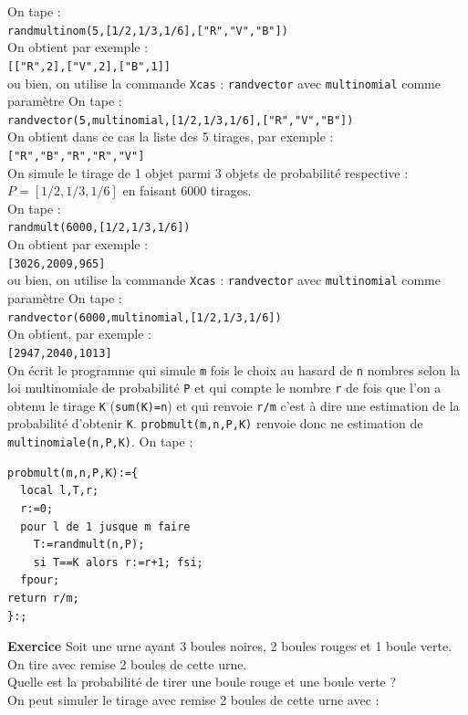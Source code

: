 \documentclass[a4paper,11pt]{book}
\begin{document}
On tape :\\
{\tt randmultinom(5,[1/2,1/3,1/6],["R","V","B"])}\\
On obtient par exemple :\\
{\tt [["R",2],["V",2],["B",1]]}\\
ou bien, on utilise la commande {\tt Xcas} : {\tt randvector} avec 
{\tt multinomial} comme param\`etre
On tape :\\
{\tt randvector(5,multinomial,[1/2,1/3,1/6],["R","V","B"])}\\
On obtient dans ce cas la liste des 5 tirages, par exemple :\\
{\tt ["R","B","R","R","V"]}\\
On simule le tirage de 1 objet parmi 3 objets de probabilit\'e respective :\\
$P=[1/2,1/3,1/6]$ en faisant 6000 tirages.\\
On tape :\\
{\tt randmult(6000,[1/2,1/3,1/6])}\\
On obtient par exemple :\\
{\tt [3026,2009,965]}\\
ou bien, on utilise la commande {\tt Xcas} : {\tt randvector} avec 
{\tt multinomial} comme param\`etre
On tape :\\
{\tt randvector(6000,multinomial,[1/2,1/3,1/6])}\\
On obtient, par exemple :\\
{\tt [2947,2040,1013]}\\
On \'ecrit le programme qui simule {\tt m} fois le choix  au hasard de {\tt n}
nombres selon la loi multinomiale de probabilit\'e {\tt P} et qui compte le 
nombre {\tt r} de fois que l'on a obtenu le tirage {\tt K} ({\tt sum(K)=n}) et
qui renvoie {\tt r/m} c'est \`a dire une estimation de la probabilit\'e 
d'obtenir {\tt K}. {\tt probmult(m,n,P,K)} renvoie donc ne estimation de 
{\tt multinomiale(n,P,K)}.
On tape :
\begin{verbatim}
probmult(m,n,P,K):={
  local l,T,r;
  r:=0;
  pour l de 1 jusque m faire
    T:=randmult(n,P);
    si T==K alors r:=r+1; fsi;
  fpour;
return r/m;
}:;
\end{verbatim}
{\bf Exercice} Soit une urne ayant 3 boules noires, 2 boules rouges et 1 boule 
verte. On tire 
avec remise 2 boules de cette urne.\\
Quelle est la probabilit\'e de tirer une boule rouge et une boule verte ?\\
 On peut simuler le tirage avec remise 2 boules de cette urne avec :\\
\end{document}
